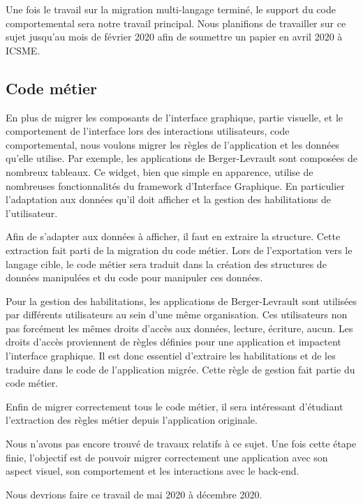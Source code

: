 \documentclass[a4paper]{article}
\begin{document}
Une fois le travail sur la migration multi-langage terminé,
  le support du code comportemental sera notre travail principal.
Nous planifions de travailler sur ce sujet jusqu'au mois de février 2020 afin de soumettre un papier en avril 2020 à ICSME.

\subsection{Code métier}
\label{sec:codeMetier}

En plus de migrer les composants de l'interface graphique, partie visuelle, 
  et le comportement de l'interface lors des interactions utilisateurs, code comportemental,
  nous voulons migrer les règles de l'application et les données qu'elle utilise.
Par exemple, les applications de Berger-Levrault sont composées de nombreux tableaux.
Ce widget, bien que simple en apparence, utilise de nombreuses fonctionnalités du framework d'Interface Graphique.
En particulier l'adaptation aux données qu'il doit afficher
  et la gestion des habilitations de l'utilisateur.

Afin de s'adapter aux données à afficher, il faut en extraire la structure.
Cette extraction fait parti de la migration du code métier.
Lors de l'exportation vers le langage cible, 
  le code métier sera traduit dans la création des structures de données manipulées 
  et du code pour manipuler ces données.

Pour la gestion des habilitations, 
  les applications de Berger-Levrault sont utilisées par différents utilisateurs au sein d'une même organisation.
Ces utilisateurs non pas forcément les mêmes droits d'accès aux données, \eg lecture, écriture, aucun.
Les droits d'accès proviennent de règles définies pour une application 
  et impactent l'interface graphique.
Il est donc essentiel d'extraire les habilitations et de les traduire dans le code de l'application migrée.
Cette règle de gestion fait partie du code métier.

Enfin de migrer correctement tous le code métier, 
  il sera intéressant d'étudiant l'extraction des règles métier depuis l'application originale.

Nous n'avons pas encore trouvé de travaux relatifs à ce sujet.
Une fois cette étape finie, l'objectif est de pouvoir migrer correctement une application 
  avec son aspect visuel, son comportement et les interactions avec le back-end.

Nous devrions faire ce travail de mai 2020 à décembre 2020.
\end{document}
